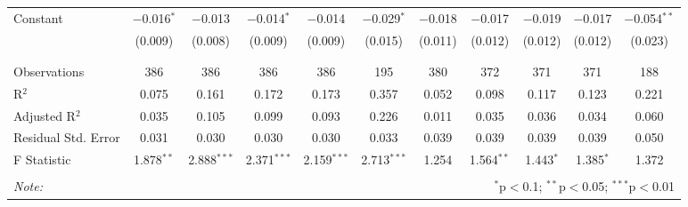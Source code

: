 \begin{table}[H]
\begin{tabular}{@{\extracolsep{4pt}}lcccccccccc}
 Constant & $-$0.016$^{*}$ & $-$0.013 & $-$0.014$^{*}$ & $-$0.014 & $-$0.029$^{*}$ & $-$0.018 & $-$0.017 & $-$0.019 & $-$0.017 & $-$0.054$^{**}$ \\ 
  & (0.009) & (0.008) & (0.009) & (0.009) & (0.015) & (0.011) & (0.012) & (0.012) & (0.012) & (0.023) \\ 
  & & & & & & & & & & \\ 
\hline \\[-1.8ex] 
Observations & 386 & 386 & 386 & 386 & 195 & 380 & 372 & 371 & 371 & 188 \\ 
R$^{2}$ & 0.075 & 0.161 & 0.172 & 0.173 & 0.357 & 0.052 & 0.098 & 0.117 & 0.123 & 0.221 \\ 
Adjusted R$^{2}$ & 0.035 & 0.105 & 0.099 & 0.093 & 0.226 & 0.011 & 0.035 & 0.036 & 0.034 & 0.060 \\ 
Residual Std. Error & 0.031 & 0.030 & 0.030 & 0.030 & 0.033 & 0.039 & 0.039 & 0.039 & 0.039 & 0.050 \\ 
F Statistic & 1.878$^{**}$ & 2.888$^{***}$ & 2.371$^{***}$ & 2.159$^{***}$ & 2.713$^{***}$ & 1.254 & 1.564$^{**}$ & 1.443$^{*}$ & 1.385$^{*}$ & 1.372 \\ 
\hline 
\hline \\[-1.8ex] 
\textit{Note:}  & \multicolumn{10}{r}{$^{*}$p$<$0.1; $^{**}$p$<$0.05; $^{***}$p$<$0.01} \\ 
\end{tabular} 
\end{table} 
